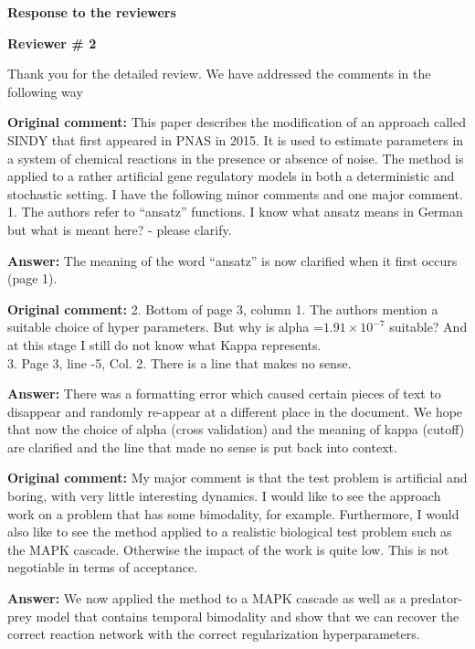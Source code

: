 \documentclass[11pt,english]{article}
\title{}
\begin{document}

\textbf{{\Large Response to the reviewers}}\newline

\textbf{{\large Reviewer \# 2}}\newline

Thank you for the detailed review. We have addressed the comments in the
following way\newline

\textbf{Original comment:}
{This paper describes the modification of an approach called SINDY that first appeared in PNAS in 2015. It is used to estimate parameters in a system of chemical reactions in the presence or absence of noise. The method is applied to a rather artificial gene regulatory models in both a deterministic and stochastic setting. I have the following minor comments and one major comment.\\
1. The authors refer to ``ansatz'' functions. I know what ansatz means in German but what is meant here? - please clarify.}\newline

\textbf{Answer:}
The meaning of the word ``ansatz'' is now clarified when it first occurs (page 1).\newline

\textbf{Original comment:}
{2. Bottom of page 3, column 1. The authors mention a suitable choice of hyper parameters. But why is alpha =$1.91\times 10^{-7}$ suitable? And at this stage I still do not know what Kappa represents.\\
3. Page 3, line -5, Col. 2. There is a line that makes no sense.}\newline

\textbf{Answer:}
There was a formatting error which caused certain pieces of
text to disappear and randomly re-appear at a different place in the
document. We hope that now the choice of alpha (cross validation) and
the meaning of kappa (cutoff) are clarified and the line that made no
sense is put back into context.\newline

\textbf{Original comment:}
{My major comment is that the test problem is artificial and boring, with very little interesting dynamics. I would like to see the approach work on a problem that has some bimodality, for example. Furthermore, I would also like to see the method applied to a realistic biological test problem such as the MAPK cascade. Otherwise the impact of the work is quite low. This is not negotiable in terms of acceptance.}\newline

\textbf{Answer:}
We now applied the method to a MAPK cascade as well as a predator-prey model that contains
temporal bimodality and show that we can recover the correct reaction
network with the correct regularization hyperparameters.
\end{document}
